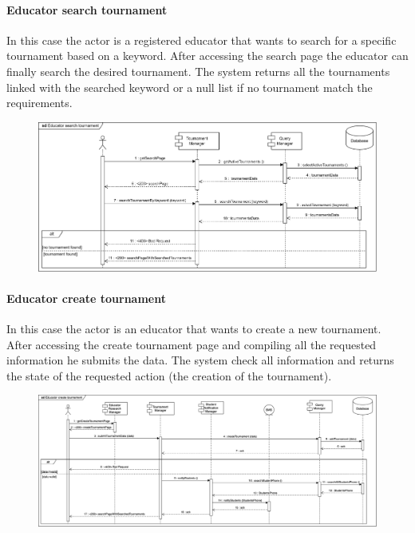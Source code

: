 \documentclass[12pt, a4paper]{report}
\begin{document}
    \paragraph*{Educator search tournament}
    In this case the actor is a registered educator that wants to search for a specific tournament based on a keyword. 
    After accessing the search page the educator can finally search the desired tournament. 
    The system returns all the tournaments linked with the searched keyword or a null list if no tournament match the requirements. 
    \begin{figure}[H]
        \centering
        \includegraphics[width=1.0\linewidth]{images/estrv.png}
    \end{figure}

    \paragraph*{Educator create tournament}
    In this case the actor is an educator that wants to create a new tournament. 
    After accessing the create tournament page and compiling all the requested information he submits the data. 
    The system check all information and returns the state of the requested action (the creation of the tournament). 
    \begin{figure}[H]
        \centering
        \includegraphics[width=1.0\linewidth]{images/ectrv.png}
    \end{figure}
\end{document}
